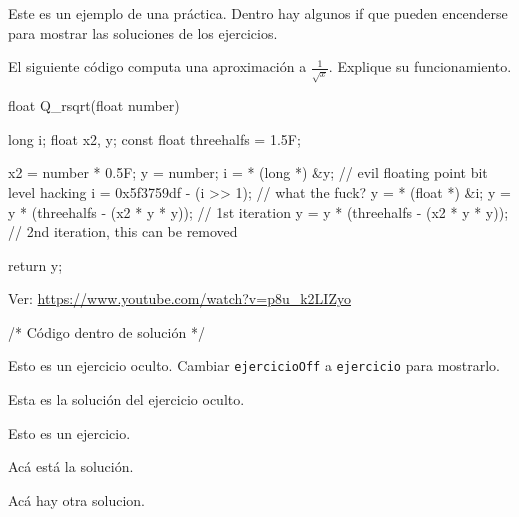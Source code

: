 \documentclass[debug,practica]{lcc}
\begin{document}
\maketitle

Este es un ejemplo de una práctica. Dentro hay algunos if que pueden
encenderse para mostrar las soluciones de los ejercicios.

\begin{ejercicio}
    El siguiente código computa una aproximación a
    $\frac{1}{\sqrt{x}}$. Explique su funcionamiento.
    \begin{C}
float Q_rsqrt(float number)
{
    long i;
    float x2, y;
    const float threehalfs = 1.5F;

    x2 = number * 0.5F;
    y  = number;
    i  = * (long *) &y;                   // evil floating point bit level hacking
    i  = 0x5f3759df - (i >> 1);           // what the fuck?
    y  = * (float *) &i;
    y  = y * (threehalfs - (x2 * y * y)); // 1st iteration
    y  = y * (threehalfs - (x2 * y * y)); // 2nd iteration, this can be removed

    return y;
}
    \end{C}
    \begin{solucion}
        Ver: \url{https://www.youtube.com/watch?v=p8u_k2LIZyo}
        \begin{C}
/* Código dentro de solución */
        \end{C}
    \end{solucion}
\end{ejercicio}

\begin{ejercicioOff}
    Esto es un ejercicio oculto. Cambiar \texttt{ejercicioOff} a
    \texttt{ejercicio} para mostrarlo.
    \begin{solucion}
        Esta es la solución del ejercicio oculto.
    \end{solucion}
\end{ejercicioOff}

\begin{ejercicio}
    Esto es un ejercicio.
    \begin{solucion}
        Acá está la solución.
    \end{solucion}
    \begin{solucion}[variante 2]
        Acá hay otra solucion.
    \end{solucion}
\end{ejercicio}
\end{document}
